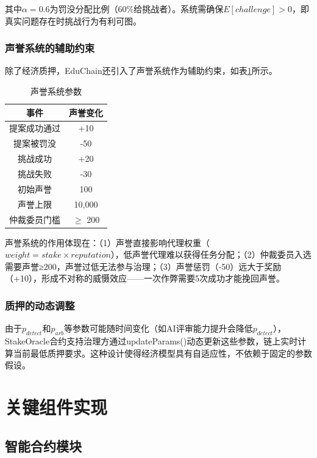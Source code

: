 \documentclass[10.5pt,compsoc]{CjC}
\begin{document}
其中$\alpha = 0.6$为罚没分配比例（60\%给挑战者）。系统需确保$E[challenge] > 0$，即真实问题存在时挑战行为有利可图。

\subsubsection{声誉系统的辅助约束}

除了经济质押，EduChain还引入了声誉系统作为辅助约束，如表\ref{tab:reputation}所示。

\begin{table}[H]
\centering
{}
\renewcommand{\arraystretch}{1.1}
\begin{tabular}{|c|c|}
\hline
\textbf{事件} & \textbf{声誉变化} \\
\hline
提案成功通过 & +10 \\
提案被罚没 & -50 \\
挑战成功 & +20 \\
挑战失败 & -30 \\
初始声誉 & 100 \\
声誉上限 & 10,000 \\
仲裁委员门槛 & $\geq$ 200 \\
\hline
\end{tabular}
\caption{声誉系统参数}
\label{tab:reputation}
\end{table}

声誉系统的作用体现在：（1）声誉直接影响代理权重（$weight = stake \times reputation$），低声誉代理难以获得任务分配；（2）仲裁委员入选需要声誉≥200，声誉过低无法参与治理；（3）声誉惩罚（-50）远大于奖励（+10），形成不对称的威慑效应——一次作弊需要5次成功才能挽回声誉。

\subsubsection{质押的动态调整}

由于$p_{detect}$和$p_{arb}$等参数可能随时间变化（如AI评审能力提升会降低$p_{detect}$），StakeOracle合约支持治理方通过updateParams()动态更新这些参数，链上实时计算当前最低质押要求。这种设计使得经济模型具有自适应性，不依赖于固定的参数假设。

\section{关键组件实现}

\subsection{智能合约模块}
\end{document}
